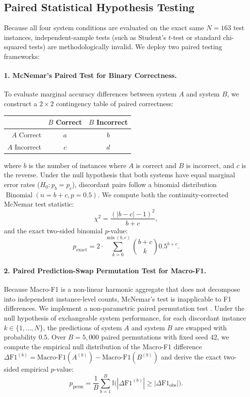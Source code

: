 \subsection{Paired Statistical Hypothesis Testing}
Because all four system conditions are evaluated on the exact same $N=163$ test instances, independent-sample tests (such as Student's $t$-test or standard chi-squared tests) are methodologically invalid. We deploy two paired testing frameworks:

\paragraph{1. McNemar's Paired Test for Binary Correctness.}
To evaluate marginal accuracy differences between system $A$ and system $B$, we construct a $2 \times 2$ contingency table of paired correctness:
\begin{center}
\small
\begin{tabular}{rcc}
\toprule
 & $B$ Correct & $B$ Incorrect \\
\midrule
$A$ Correct & $a$ & $b$ \\
$A$ Incorrect & $c$ & $d$ \\
\bottomrule
\end{tabular}
\end{center}
where $b$ is the number of instances where $A$ is correct and $B$ is incorrect, and $c$ is the reverse. Under the null hypothesis that both systems have equal marginal error rates ($H_0: p_b = p_c$), discordant pairs follow a binomial distribution $\operatorname{Binomial}(n=b+c, p=0.5)$. We compute both the continuity-corrected McNemar test statistic:
\begin{equation}
    \chi^2 = \frac{(|b - c| - 1)^2}{b + c},
\end{equation}
and the exact two-sided binomial $p$-value:
\begin{equation}
    p_{\text{exact}} = 2 \cdot \sum_{k=0}^{\min(b, c)} \binom{b+c}{k} 0.5^{b+c}.
\end{equation}

\paragraph{2. Paired Prediction-Swap Permutation Test for Macro-F1.}
Because Macro-F1 is a non-linear harmonic aggregate that does not decompose into independent instance-level counts, McNemar's test is inapplicable to F1 differences. We implement a non-parametric paired permutation test \citep{benjamini-hochberg-1995}. Under the null hypothesis of exchangeable system performance, for each discordant instance $k \in \{1, \dots, N\}$, the predictions of system $A$ and system $B$ are swapped with probability $0.5$. Over $B = 5,000$ paired permutations with fixed seed 42, we compute the empirical null distribution of the Macro-F1 difference $\Delta \text{F1}^{(b)} = \text{Macro-F1}(A^{(b)}) - \text{Macro-F1}(B^{(b)})$ and derive the exact two-sided empirical $p$-value:
\begin{equation}
    p_{\text{perm}} = \frac{1}{B} \sum_{b=1}^B \mathbb{I}\Big(|\Delta \text{F1}^{(b)}| \ge |\Delta \text{F1}_{\text{obs}}|\Big).
\end{equation}
